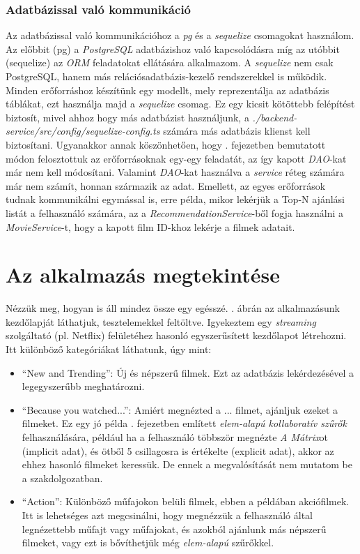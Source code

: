 \documentclass[
]{thesis-ekf}
\theoremstyle{definition}
\theoremstyle{remark}
\begin{document}
\subsubsection{Adatbázissal való kommunikáció}
Az adatbázissal való kommunikációhoz a \emph{pg} és a \emph{sequelize} csomagokat használom. Az előbbit (pg) a \emph{PostgreSQL} adatbázishoz való kapcsolódásra míg az utóbbit (sequelize) az \emph{ORM} feladatokat ellátására alkalmazom. A \emph{sequelize} nem csak PostgreSQL, hanem más relációsadatbázis-kezelő rendszerekkel is működik. Minden erőforráshoz készítünk egy modellt, mely reprezentálja az adatbázis táblákat, ezt használja majd a \emph{sequelize} csomag. Ez egy kicsit kötöttebb felépítést biztosít, mivel ahhoz hogy más adatbázist használjunk, a \emph{./backend-service/src/config/sequelize-config.ts} számára más adatbázis klienst kell biztosítani. Ugyanakkor annak köszönhetően, hogy . fejezetben bemutatott módon felosztottuk az erőforrásoknak egy-egy feladatát, az így kapott \emph{DAO}-kat már nem kell módosítani. Valamint \emph{DAO}-kat használva a \emph{service} réteg számára már nem számít, honnan származik az adat. Emellett, az egyes erőforrások tudnak kommunikálni egymással is, erre példa, mikor lekérjük a Top-N ajánlási listát a felhasználó számára, az a \emph{RecommendationService}-ből fogja használni a \emph{MovieService}-t, hogy a kapott film ID-khoz lekérje a filmek adatait.

\section{Az alkalmazás megtekintése}
Nézzük meg, hogyan is áll mindez össze egy egésszé. . ábrán az alkalmazásunk kezdőlapját láthatjuk, tesztelemekkel feltöltve. Igyekeztem egy \emph{streaming} szolgáltató (pl. Netflix) felületéhez hasonló egyszerűsített kezdőlapot létrehozni. Itt különböző kategóriákat láthatunk, úgy mint: 
\begin{itemize}
	\item ``New and Trending'': Új és népszerű filmek. Ezt az adatbázis lekérdezésével a legegyszerűbb meghatározni.
	\item ``Because you watched...'': Amiért megnézted a ... filmet, ajánljuk ezeket a filmeket. Ez egy jó példa . fejezetben említett \emph{elem-alapú kollaboratív szűrők} felhasználására, például ha a felhasználó többször megnézte \emph{A Mátrix}ot (implicit adat), és ötből 5 csillagosra is értékelte (explicit adat), akkor az ehhez hasonló filmeket keressük. De ennek a megvalósítását nem mutatom be a szakdolgozatban.
	\item ``Action'': Különböző műfajokon belüli filmek, ebben a példában akciófilmek. Itt is lehetséges azt megcsinálni, hogy megnézzük a felhasználó által legnézettebb műfajt vagy műfajokat, és azokból ajánlunk más népszerű filmeket, vagy ezt is bővíthetjük még \emph{elem-alapú} szűrőkkel.
\end{itemize} 
\end{document}
